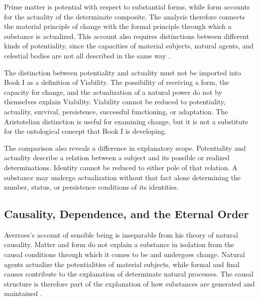 Prime matter is potential with respect to substantial
forms, while form accounts for the actuality of
the determinate composite. The analysis therefore
connects the material principle of change with the
formal principle through which a substance is
actualized. This account also requires distinctions
between different kinds of potentiality, since
the capacities of material subjects, natural agents,
and celestial bodies are not all described in
the same way
\citep{AverroesEpitomeMetaphysicsArnzen2010,
AverroesLongCommentaryMetaphysicsBouyges1990}.

\label{para:VS.B01.P01.C08.S15.SS11.P003}

The distinction between potentiality and actuality
must not be imported into Book I as a definition
of Viability. The possibility of receiving a form,
the capacity for change, and the actualization of
a natural power do not by themselves explain
Viability. Viability cannot be reduced to potentiality,
actuality, survival, persistence, successful
functioning, or adaptation. The Aristotelian
distinction is useful for examining change, but
it is not a substitute for the ontological concept
that Book I is developing.

\label{para:VS.B01.P01.C08.S15.SS11.P004}

The comparison also reveals a difference in
explanatory scope. Potentiality and actuality
describe a relation between a subject and its
possible or realized determinations. Identity
cannot be reduced to either pole of that relation.
A substance may undergo actualization without
that fact alone determining the number, status,
or persistence conditions of its identities.



\subsection{Causality, Dependence, and the Eternal Order}
\label{subsec:ch08_s15_ss12}

\label{para:VS.B01.P01.C08.S15.SS12.P001}

Averroes's account of sensible being is inseparable
from his theory of natural causality. Matter and
form do not explain a substance in isolation from
the causal conditions through which it comes to
be and undergoes change. Natural agents actualize
the potentialities of material subjects, while
formal and final causes contribute to the explanation
of determinate natural processes. The causal
structure is therefore part of the explanation
of how substances are generated and maintained
\citep{AristotlePhysics,
AverroesIncoherenceVanDenBergh1954,
BenAhmedPasnauIbnRushdSEP2025}.

